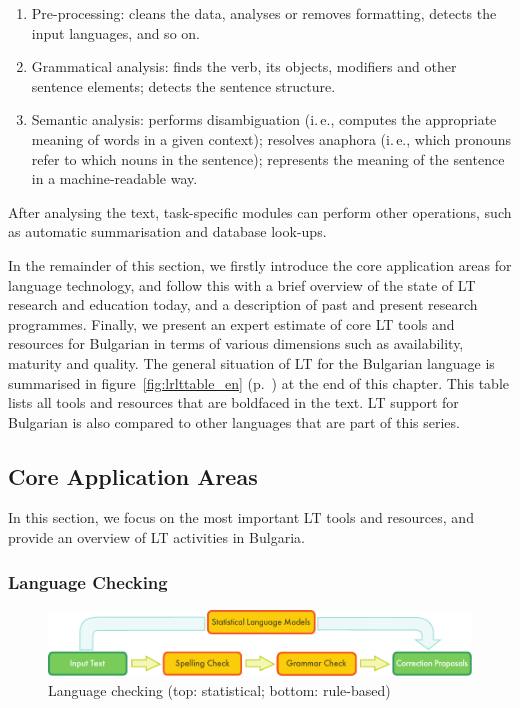 \begin{multicols}{2}
  \begin{enumerate}
  \item Pre-processing: cleans the data, analyses or removes formatting, detects the input languages, and so on.
  \item Grammatical analysis: finds the verb, its objects, modifiers and other sentence elements; detects the sentence structure.
  \item Semantic analysis: performs disambiguation (i.\,e., computes the appropriate meaning of words in a given context); resolves anaphora (i.\,e., which pronouns refer to which nouns in the sentence); represents the meaning of the sentence in a machine-readable way.
  \end{enumerate}

  After analysing the text, task-specific modules can perform other operations, such as automatic summarisation and database look-ups.

  In the remainder of this section, we firstly introduce the core application areas for language technology, and follow this with a brief overview of the state of LT research and education today, and a description of past and present research programmes. Finally, we present an expert estimate of core LT tools and resources for Bulgarian in terms of various dimensions such as availability, maturity and quality. 
The general situation of LT for the Bulgarian language is summarised in
figure~\ref{fig:lrlttable_en} (p.~\pageref{fig:lrlttable_en}) at the end of this chapter. This table lists all tools and
resources that are boldfaced in the text.
LT support for Bulgarian is also compared to other languages that are part of this series.

  \subsection{Core Application Areas}

  In this section, we focus on the most important LT tools and resources, and provide an overview of LT activities in Bulgaria. 

  \subsubsection{Language Checking}

  \begin{figure}[t]
    \center
    \includegraphics[width=\textwidth]{../_media/english/language_checking}
    \caption{Language checking (top: statistical; bottom: rule-based)}
    \label{fig:langcheckingaarch_en}
  \end{figure}


\end{multicols}

